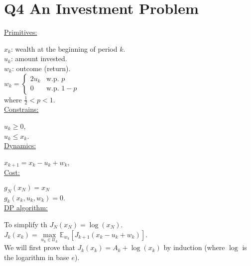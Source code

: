 \documentclass[11pt, english]{article}
\begin{document}
\section{Q4 An Investment Problem}

\underline{Primitives:\\} 

$x_k$: wealth at the beginning of period $k$.\\
$u_k$: amount invested.\\
$w_k$: outcome (return).\\
$w_k=\left\{\begin{array}{ll}
2u_k & \text{w.p. }p\\
0 & \text{w.p. }1-p
\end{array}\right.$\\
where $\frac{1}{2}<p<1$.\\

\underline{Constrains:\\}

$u_k\geq 0$, \\
$u_k\leq x_k$.\\

\underline{Dynamics:\\}

$x_{k+1}=x_k-u_k+w_k$, \\

\underline{Cost:\\}

$g_N(x_N)=x_N$\\
$g_k(x_k,u_k,w_k)=0$. \\

\underline{DP algorithm:\\}

To simplify th
$J_N(x_N)=\log(x_N)$. \\
$J_k(x_k)=\underset{u_k\in \mathcal{U}_k}{\max}\mathbb{E}_{w_k}\left[J_{k+1}(x_k-u_k+w_k)\right]$.\\
We will first prove that $J_k(x_k)=A_k+\log(x_k)$ by induction (where $\log$ is the logarithm in base $e$).
\end{document}
